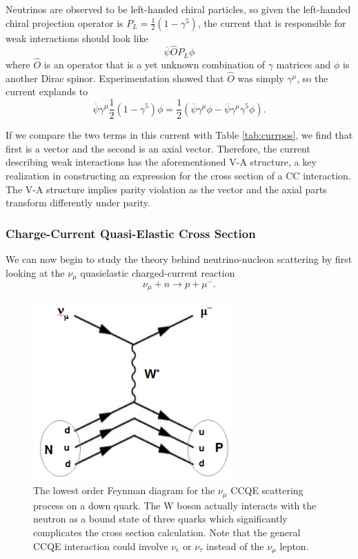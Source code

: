 Neutrinos are observed to be left-handed chiral particles, so given the left-handed chiral projection operator is $P_L = \frac{1}{2}\left( 1-\gamma^5\right)$, the current that is responsible for weak interactions should look like
\begin{equation}
\overline{\psi} \hat{O} P_L \phi
\end{equation}
where $\hat{O}$ is an operator that is a yet unknown combination of $\gamma$ matrices and $\phi$ is another Dirac spinor. Experimentation showed that $\hat{O}$ was simply $\gamma^\mu$, so the current explands to
\begin{equation}
\overline{\psi} \gamma^\mu \frac{1}{2}\left(1-\gamma^5\right) \phi = \frac{1}{2} \left(\overline{\psi}\gamma^\mu\phi - \overline{\psi} \gamma^\mu\gamma^5\phi\right).
\end{equation}

If we compare the two terms in this current with Table \ref{tab:currpos}, we find that first is a vector and the second is an axial vector. Therefore, the current describing weak interactions has the aforementioned V-A structure, a key realization in constructing an expression for the cross section of a CC interaction. The V-A structure implies parity violation as the vector and the axial parts transform differently under parity.

\subsubsection{Charge-Current Quasi-Elastic Cross Section}
\label{sec:ccqexsec}

We can now begin to study the theory behind neutrino-nucleon scattering by first looking at the $\nu_\mu$ quasielastic charged-current reaction
\begin{equation}
\nu_\mu + n \rightarrow p + \mu^{-}.
\end{equation}

\begin{figure}
\centering
\includegraphics[width=3in]{Figures/ccqefeynman.png}
\caption{The lowest order Feynman diagram for the $\nu_\mu$ CCQE scattering process on a down quark. The W boson actually interacts with the neutron as a bound state of three quarks which significantly complicates the cross section calculation. Note that the general CCQE interaction could involve $\nu_e$ or $\nu_\tau$ instead of the $\nu_\mu$ lepton.} 
\label{fig:ccqefeynman}
\end{figure}

